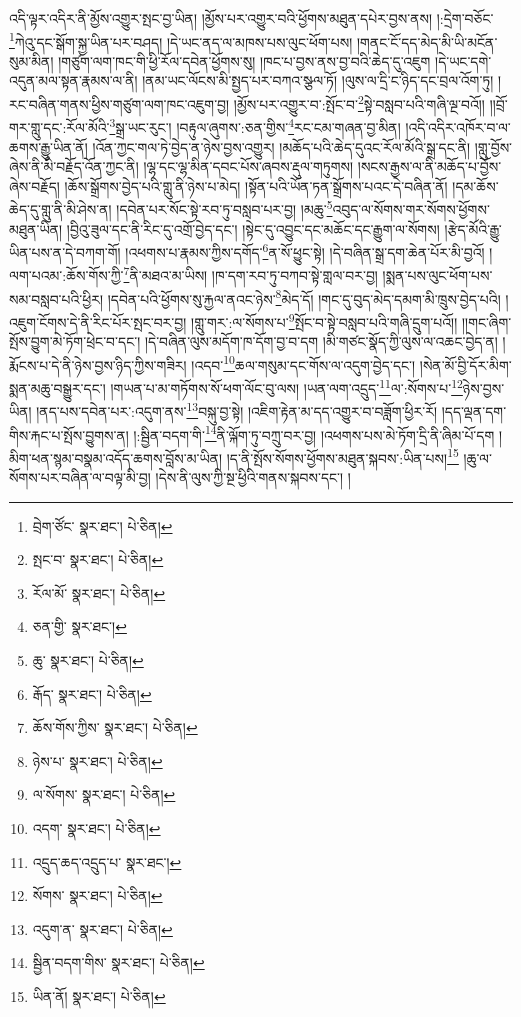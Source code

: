 འདི་ལྟར་འདིར་ནི་མྱོས་འགྱུར་སྤང་བྱ་ཡིན། །མྱོས་པར་འགྱུར་བའི་ཕྱོགས་མཐུན་དཔེར་བྱས་ནས། །:དྲེག་བཅོང་\footnote{བྲེག་ཙོང་  སྣར་ཐང་།  པེ་ཅིན། }ཀེའུ་དང་སྒོག་སྐྱ་ཡིན་པར་བཤད། །དེ་ཡང་ནད་ལ་མཁས་པས་ལུང་ཕོག་པས། །གནང་ངོ་དད་མེད་མི་ཡི་མངོན་སུམ་མིན། །གཙུག་ལག་ཁང་གི་ཕྱི་རོལ་དབེན་ཕྱོགས་སུ། །ཁང་པ་བྱས་ནས་བྱ་བའི་ཆེད་དུ་འཇུག །དེ་ཡང་དགེ་འདུན་མལ་སྟན་རྣམས་ལ་ནི། །ནམ་ཡང་ལོངས་མི་སྤྱད་པར་བཀའ་སྩལ་ཏོ། །ལུས་ལ་དྲི་ང་ཉིད་དང་བྲལ་འོག་ཏུ། །རང་བཞིན་གནས་ཕྱིས་གཙུག་ལག་ཁང་འཇུག་བྱ། །མྱོས་པར་འགྱུར་བ་:སྤོང་བ་\footnote{སྤང་བ་  སྣར་ཐང་།  པེ་ཅིན། }སྟེ་བསླབ་པའི་གཞི་ལྔ་བའོ།། །།བྲོ་གར་གླུ་དང་:རོལ་མོའི་\footnote{རོལ་མོ་  སྣར་ཐང་།  པེ་ཅིན། }སྒྲ་ཡང་རུང་། །བརྟུལ་ཞུགས་:ཅན་གྱིས་\footnote{ཅན་གྱི་  སྣར་ཐང་། }རང་ངམ་གཞན་བྱ་མིན། །འདི་འདིར་འཁོར་བ་ལ་ཆགས་རྒྱུ་ཡིན་ནོ། །འོན་ཀྱང་གལ་ཏེ་བྱེད་ན་ཉེས་བྱས་འགྱུར། །མཆོད་པའི་ཆེད་དུའང་རོལ་མོའི་སྒྲ་དང་ནི། །གླུ་བྱོས་ཞེས་ནི་མི་བརྗོད་འོན་ཀྱང་ནི། །ལྷ་དང་ལྷ་མིན་དབང་པོས་ཞབས་རྡུལ་གཏུགས། །སངས་རྒྱས་ལ་ནི་མཆོད་པ་བྱོས་ཞེས་བརྗོད། །ཆོས་སྒྲོགས་བྱེད་པའི་གླུ་ནི་ཉེས་པ་མེད། །སྟོན་པའི་ཡོན་ཏན་སྒྲོགས་པའང་དེ་བཞིན་ནོ། །དམ་ཆོས་ཆེད་དུ་གླུ་ནི་མི་ཤེས་ན། །དབེན་པར་སོང་སྟེ་རབ་ཏུ་བསླབ་པར་བྱ། །མཆུ་\footnote{ཆུ་  སྣར་ཐང་།  པེ་ཅིན། }འབུད་ལ་སོགས་གར་སོགས་ཕྱོགས་མཐུན་ཡིན། །བྱིའུ་ཟུལ་དང་ནི་རིང་དུ་འགྲོ་བྱེད་དང་། །སྟེང་དུ་འབྱུང་དང་མཆོང་དང་རྒྱུག་ལ་སོགས། །རྩེད་མོའི་རྒྱུ་ཡིན་པས་ན་དེ་བཀག་གོ། །འཕགས་པ་རྣམས་ཀྱིས་དགོད་\footnote{རྒོད་  སྣར་ཐང་།  པེ་ཅིན། }ན་སོ་ཕྱུང་སྟེ། །དེ་བཞིན་སྒྲ་དག་ཆེན་པོར་མི་བྱའོ། །ལག་པའམ་:ཆོས་གོས་ཀྱི་\footnote{ཆོས་གོས་ཀྱིས་  སྣར་ཐང་།  པེ་ཅིན། }ནི་མཐའ་མ་ཡིས། །ཁ་དག་རབ་ཏུ་བཀབ་སྟེ་གླལ་བར་བྱ། །སྨན་པས་ལུང་ཕོག་པས་སམ་བསླབ་པའི་ཕྱིར། །དབེན་པའི་ཕྱོགས་སུ་རྐྱལ་ནའང་ཉེས་\footnote{ཉེས་པ་  སྣར་ཐང་།  པེ་ཅིན། }མེད་དོ། །གང་དུ་བུད་མེད་དམག་མི་ཁྲུས་བྱེད་པའི། །འཇུག་ངོགས་དེ་ནི་རིང་པོར་སྤང་བར་བྱ། །གླུ་གར་:ལ་སོགས་པ་\footnote{ལ་སོགས་  སྣར་ཐང་།  པེ་ཅིན། }སྤོང་བ་སྟེ་བསླབ་པའི་གཞི་དྲུག་པའོ།། །།གང་ཞིག་སྤོས་བྱུག་མེ་ཏོག་ཕྲེང་བ་དང་། །དེ་བཞིན་ལུས་མདོག་ཁ་དོག་བྱ་བ་དག །མི་གཙང་སྣོད་ཀྱི་ལུས་ལ་འཆང་བྱེད་ན། །རྨོངས་པ་དེ་ནི་ཉེས་བྱས་ཉིད་ཀྱིས་གཟིར། །འདབ་\footnote{འདག་  སྣར་ཐང་།  པེ་ཅིན། }ཆལ་གསུམ་དང་གོས་ལ་འདུག་བྱེད་དང་། །སེན་མོ་བྱི་དོར་མིག་སྨན་མཆུ་བསྒྱུར་དང་། །གཡན་པ་མ་གཏོགས་སོ་ཕག་ལོང་བུ་ལས། །ཡན་ལག་འདྲུད་\footnote{འདྲུད་ཆད་འདྲུད་པ་  སྣར་ཐང་། }ལ་:སོགས་པ་\footnote{སོགས་  སྣར་ཐང་།  པེ་ཅིན། }ཉེས་བྱས་ཡིན། །ནད་པས་དབེན་པར་:འདུག་ནས་\footnote{འདུག་ན་  སྣར་ཐང་།  པེ་ཅིན། }བསྐུ་བྱ་སྟེ། །འཇིག་རྟེན་མ་དད་འགྱུར་བ་བཟློག་ཕྱིར་རོ། །དད་ལྡན་དག་གིས་རྐང་པ་སྤོས་བྱུགས་ན། །:སྦྱིན་བདག་གི་\footnote{སྦྱིན་བདག་གིས་  སྣར་ཐང་།  པེ་ཅིན། }ནི་ལྐོག་ཏུ་བཀྲུ་བར་བྱ། །འཕགས་པས་མེ་ཏོག་དྲི་ནི་ཞིམ་པོ་དག །མིག་ཕན་སྙམ་བསྣམ་འདོད་ཆགས་བློས་མ་ཡིན། །ད་ནི་སྤོས་སོགས་ཕྱོགས་མཐུན་སྐབས་:ཡིན་པས།\footnote{ཡིན་ནོ།  སྣར་ཐང་།  པེ་ཅིན། } །ཆུ་ལ་སོགས་པར་བཞིན་ལ་བལྟ་མི་བྱ། །དེས་ནི་ལུས་ཀྱི་སྔ་ཕྱིའི་གནས་སྐབས་དང་། །
